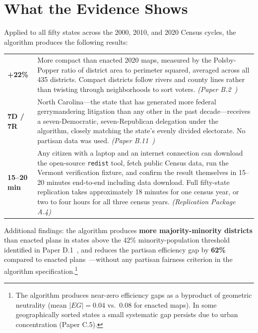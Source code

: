 
\section{What the Evidence Shows}

Applied to all fifty states across the 2000, 2010, and 2020 Census cycles,
the algorithm produces the following results:

\bigskip

\noindent
\begin{tabular}{@{}>{\bfseries\large}p{} p{}@{}}
+22\% &
More compact than enacted 2020 maps, measured by the Polsby-Popper
ratio of district area to perimeter squared, averaged across all 435 districts.
Compact districts follow rivers and county lines rather than
twisting through neighborhoods to sort voters.
\textit{(Paper B.2~\cite{dellaLibera2026edgeWeighted})}\\[10pt]

7D / 7R &
North Carolina---the state that has generated more federal gerrymandering
litigation than any other in the past decade---receives a
seven-Democratic, seven-Republican delegation under the algorithm,
closely matching the state's evenly divided electorate.
No partisan data was used.
\textit{(Paper B.11~\cite{dellaLibera2026ncRegions})}\\[10pt]

15--20 min &
Any citizen with a laptop and an internet connection can download
the open-source \texttt{redist} tool, fetch public Census data,
run the Vermont verification fixture, and confirm the result themselves
in 15--20 minutes end-to-end including data download.
Full fifty-state replication takes approximately 18 minutes for one
census year, or two to four hours for all three census years.
\textit{(Replication Package A.4)}\\
\end{tabular}

\bigskip

\noindent Additional findings:
the algorithm produces \textbf{more majority-minority districts}
than enacted plans in states above the 42\% minority-population threshold
identified in Paper D.1~\cite{dellaLibera2026vraCompliance},
and reduces the partisan efficiency gap by \textbf{62\%} compared to
enacted plans~\cite{dellaLibera2026efficiencyGap}---without any
partisan fairness criterion in the algorithm specification.\footnote{%
The algorithm produces near-zero efficiency gaps as a byproduct of geometric
neutrality (mean $|EG|=0.04$ vs.\ $0.08$ for enacted maps).
In some geographically sorted states a small systematic gap persists due to
urban concentration (Paper C.5).}
